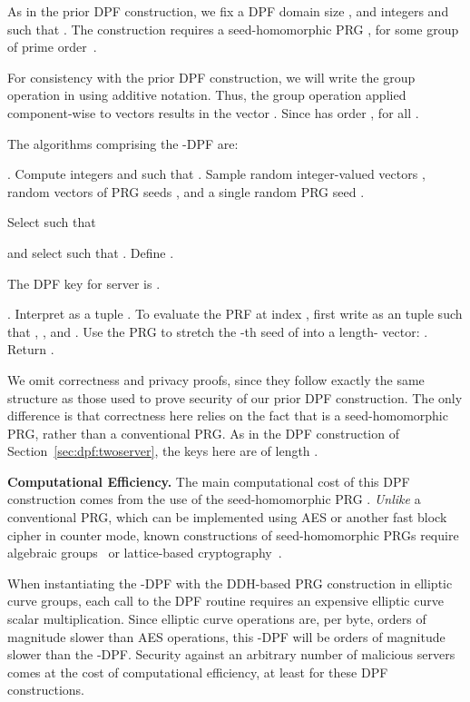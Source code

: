 \documentclass[10pt,twocolumn]{article}
\newcommand{\nicepara}[1]{\medskip\noindent\textbf{#1.}}
\begin{document}
\medskip

As in the prior DPF construction, we fix
a DPF domain size , and
integers  and  such that .
The construction requires a seed-homomorphic PRG
, for some group 
of prime order~.

For consistency with the prior DPF construction,
we will write the group operation in  
using additive notation.
Thus, the group operation applied component-wise
to vectors  results in
the vector .
Since  has order ,  for all .

The algorithms comprising the -DPF are:
\begin{compactitem}
\item
.
Compute integers  and  
such that .
Sample random integer-valued vectors ,
random vectors of PRG seeds ,
and a single random PRG seed .

Select  such that 

and select
 such that 
.
Define .

The DPF key for server  is
.

\item
.
Interpret  as a tuple .
To evaluate the PRF at index , 
first write  as an  tuple such that
, , and .
Use the PRG  to stretch the -th seed
of  into a length- vector: 
.
Return .

\end{compactitem}

We omit correctness and privacy proofs, since they follow exactly the same
structure as those used to prove security of our prior DPF construction.
The only difference is that correctness here
relies on the fact that  is a seed-homomorphic PRG, rather than a
conventional PRG.
As in the DPF construction
of Section~\ref{sec:dpf:twoserver},
the keys here are of length
. 


\nicepara{Computational Efficiency}
The main computational cost of this DPF construction
comes from the use of the seed-homomorphic PRG .
\textit{Unlike} a conventional PRG, which can be implemented
using AES or another fast block cipher in counter mode,
known constructions of seed-homomorphic PRGs require
algebraic groups~\cite{naor1999distributed} 
or lattice-based cryptography~\cite{banerjee2014new,boneh2013key}.

When instantiating the -DPF with 
the DDH-based PRG construction in elliptic curve groups,
each call to the DPF  routine 
requires an expensive 
elliptic curve scalar multiplication.
Since elliptic curve operations are, per byte,
orders of magnitude slower than AES operations,
this -DPF will be orders
of magnitude slower than the -DPF.
Security against an arbitrary number of malicious servers
comes at the cost of computational efficiency, at least
for these DPF constructions.
\end{document}
